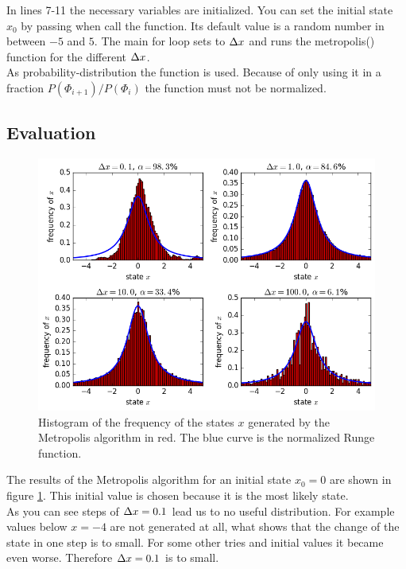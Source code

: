 
In lines 7-11 the necessary variables are initialized.
You can set the initial state $x_0$ by passing  when call the function. Its default value is a random number in between $-5$ and $5$.
The main for loop sets  to $\Delta x$ and runs the metropolis() function for the different $\Delta x$.\\

As probability-distribution the function  is used. 
Because of only using it in a fraction $P(\Phi_{i+1})/P(\Phi_i)$ the function must not be normalized.

\subsection{Evaluation}

\begin{figure}[ht]
	\centering
	\includegraphics[width=1\textwidth]{../fig/metroplot.png}
	\caption{
		Histogram of the frequency of the states $x$ generated by the Metropolis algorithm in red.
		The blue curve is the normalized Runge function.}
	\label{metroplot}
\end{figure}

The results of the Metropolis algorithm for an initial state $x_0=0$ are shown in figure \ref{metroplot}.
This initial value is chosen because it is the most likely state.\\

As you can see steps of $\Delta x=0.1$ lead us to no useful distribution. 
For example values below $x=-4$ are not generated at all, what shows that the change of the state in one step is to small.
For some other tries and initial values it became even worse.
Therefore $\Delta x=0.1$ is to small.\\

